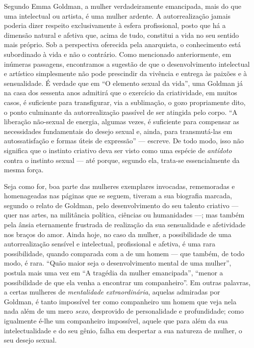 Segundo Emma Goldman, a mulher verdadeiramente emancipada, mais do que
uma intelectual ou artista, é uma mulher ardente. A autorrealização
jamais poderia dizer respeito exclusivamente à esfera profissional,
posto que há a dimensão natural e afetiva que, acima de tudo, constitui
a vida no seu sentido mais próprio. Sob a perspectiva oferecida pela
anarquista, o conhecimento está subordinado à vida e não o contrário.
Como mencionado anteriormente, em inúmeras passagens, encontramos a
sugestão de que o desenvolvimento intelectual e artístico simplesmente
não pode prescindir da vivência e entrega às paixões e à sensualidade. É
verdade que em ``O elemento sexual da vida'', uma Goldman já na casa dos
sessenta anos admitirá que o exercício da criatividade, em muitos
casos, é suficiente para transfigurar, via a sublimação, o gozo
propriamente dito, o ponto culminante da autorrealização passível de ser
atingida pelo corpo. ``A liberação não-sexual de energia, algumas vezes,
é suficiente para compensar as necessidades fundamentais do desejo
sexual e, ainda, para transmutá-las em autossatisfação e formas úteis de
expressão'' --- escreve. De todo modo, isso não significa que o instinto
criativo deva ser visto como uma espécie de \textit{antídoto} contra o
instinto sexual --- até porque, segundo ela, trata-se essencialmente da
mesma força. 

Seja como for, boa parte das mulheres exemplares invocadas,
rememoradas e homenageadas nas páginas que se seguem, tiveram a sua
biografia marcada, segundo o relato de Goldman, pelo desenvolvimento do
seu talento criativo --- quer nas artes, na militância política, ciências
ou humanidades ---; mas também pela ânsia eternamente frustrada de
realização da sua sensualidade e afetividade nos braços do amor. Ainda
hoje, no caso da mulher, a possibilidade de uma autorrealização sensível
e intelectual, profissional e afetiva, é uma rara possibilidade, quando
comparada com a de um homem --- que também, de todo modo, é rara. ``Quão
maior seja o desenvolvimento mental de uma mulher'', postula mais uma
vez em ``A tragédia da mulher emancipada'', ``menor a possibilidade de
que ela venha a encontrar um companheiro''. Em outras palavras, a certas
mulheres de \textit{mentalidade extraordinária}, aquelas admiradas por
Goldman, é tanto impossível ter como companheiro um homem que veja nela
nada além de um mero \textit{sexo}, desprovido de personalidade e
profundidade; como igualmente é-lhe um companheiro impossível, aquele
que para além da sua intelectualidade e do seu gênio, falha em despertar
a sua natureza de mulher, o seu desejo sexual. 

